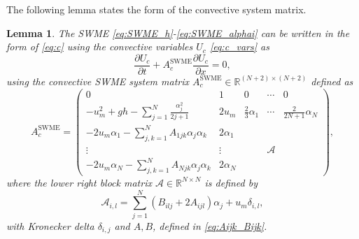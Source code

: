 \documentclass[a4paper, 11pt]{article}
\newtheorem{lemma}{Lemma}
\begin{document}
The following lemma states the form of the convective system matrix.
\begin{lemma}
    The SWME \eqref{eq:SWME_h}-\eqref{eq:SWME_alphai} can be written in the form of \eqref{eq:c} using the convective variables $U_{c}$ \eqref{eq:c_vars} as
    \begin{equation}\label{eq:SWME_c}
        \frac{\partial U_{c}}{\partial t} + A^{\textrm{SWME}}_{c} \frac{\partial U_{c}}{\partial x} = 0,
    \end{equation}
    using the convective SWME system matrix $A^{\textrm{SWME}}_{c} \in \mathbb{R}^{(N+2)\times(N+2)}$ defined as
    \begin{equation}\label{eq:A_SWME_c}
        A^{\textrm{SWME}}_{c} =
        \left(\begin{array}{ccccc}
        0 & 1 & 0 & \cdots & 0 \\
        - u_m^2 + gh - \sum\limits_{j=1}^{N} \frac{\alpha_j^2}{2j+1} & 2 u_m & \frac{2}{3} \alpha_1 & \cdots & \frac{2}{2 N+1} \alpha_N \\
        -2 u_m \alpha_1 - \sum\limits_{j,k=1}^{N} A_{1jk} \alpha_j \alpha_k & 2 \alpha_1 &  & & \\
        \vdots & \vdots & & \mathcal{A} &  \\
        -2 u_m \alpha_N - \sum\limits_{j,k=1}^{N} A_{Njk} \alpha_j \alpha_k & 2 \alpha_N &  & &
        \end{array}\right),
    \end{equation}
    where the lower right block matrix $\mathcal{A} \in \mathbb{R}^{N \times N}$ is defined by
    \begin{equation}\label{eq:A_block}
        \mathcal{A}_{i,l} = \sum\limits_{j=1}^{N} \left( B_{ilj} + 2 A_{ijl} \right) \alpha_j + u_m \delta_{i,l},
    \end{equation}
    with Kronecker delta $\delta_{i,j}$ and $A,B$, defined in \eqref{eq:Aijk_Bijk}.
\end{lemma}
\end{document}
